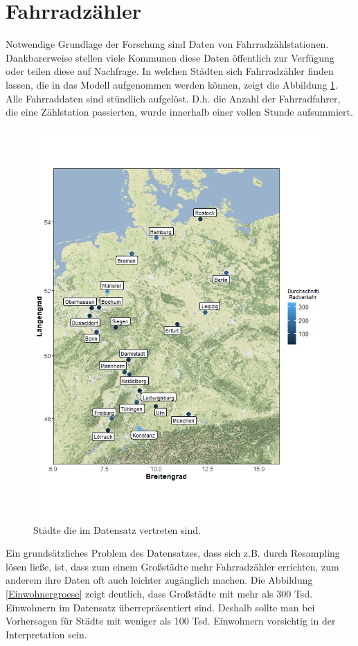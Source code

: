 \documentclass[a4paper,12pt]{thesis}
\begin{document}
\section{Fahrradzähler}

Notwendige Grundlage der Forschung sind Daten von Fahrradzählstationen. Dankbarerweise stellen viele Kommunen diese Daten öffentlich zur Verfügung oder teilen diese auf Nachfrage. In welchen Städten sich Fahrradzähler finden lassen, die in das Modell aufgenommen werden können, zeigt die Abbildung \ref{Deutschlandkarte}. Alle Fahrraddaten sind stündlich aufgelöst. D.h. die Anzahl der Fahrradfahrer, die eine Zählstation passierten, wurde innerhalb einer vollen Stunde aufsummiert.
\begin{figure}[!ht]
	\centering
	\includegraphics[width=\textwidth]{Plots/plot22.png}
	\caption{Städte die im Datensatz vertreten sind.}
	\label{Deutschlandkarte}
\end{figure}

Ein grundsätzliches Problem des Datensatzes, dass sich z.B. durch Resampling lösen ließe, ist, dass zum einem Großstädte mehr Fahrradzähler errichten, zum anderem ihre Daten oft auch leichter zugänglich machen. Die Abbildung \ref{Einwohnergroese} zeigt deutlich, dass Großstädte mit mehr als 300 Tsd. Einwohnern im Datensatz überrepräsentiert sind. Deshalb sollte man bei Vorhersagen für Städte mit weniger als 100 Tsd. Einwohnern vorsichtig in der Interpretation sein.
\end{document}
